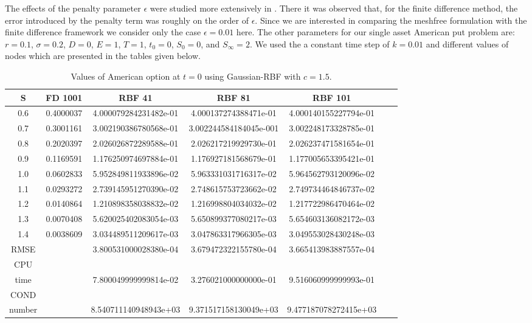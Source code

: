 \documentclass[12pt]{article}
\numberwithin{equation}{section} %
\begin{document}
The effects of the penalty parameter $\epsilon$ were studied more
extensively in \cite{ADS06}. There it was observed that, for the
finite difference method, the error introduced by the penalty term
was roughly on the order of $\epsilon$. Since we are interested in
comparing the meshfree formulation with the finite difference
framework we consider only the case $\epsilon=0.01$ here. The other
parameters for our single asset American put problem are: $r=0.1$,
$\sigma=0.2$, $D=0$, $E=1$, $T=1$, $t_0=0$, $S_0=0$, and
$S_\infty=2$. We used the  a constant time step of $k = 0.01$ and
different values of nodes which are presented in the tables given
below.
\newpage
\begin{table}[h]
\centering
\begin{tabular}{|c|c|c|c|c|c|c|}
  \hline
  S & FD 1001  & RBF 41 & RBF 81 & RBF 101 \\
  \hline
  0.6 & 0.4000037 &     4.000079284231482e-01 & 4.000137274388471e-01 & 4.000140155227794e-01 \\
  0.7 & 0.3001161  &3.002190386780568e-01  &3.002244584184045e-001 & 3.002248173328785e-01\\
  0.8 & 0.2020397  & 2.026026872289588e-01 & 2.026217219929730e-01 &  2.026237471581654e-01\\
  0.9 & 0.1169591  & 1.176250974697884e-01 & 1.176927181568679e-01 &   1.177005653395421e-01\\
  1.0 & 0.0602833  & 5.952849811933896e-02 & 5.963331031716317e-02 &  5.964562793120096e-02 \\
  1.1 & 0.0293272  & 2.739145951270390e-02 &  2.748615753723662e-02 &   2.749734464846737e-02\\
  1.2 & 0.0140864  & 1.210898358038832e-02  &  1.216998804034032e-02 & 1.217722986470464e-02 \\
  1.3 & 0.0070408  &5.620025402083054e-03   &  5.650899377080217e-03 & 5.654603136082172e-03 \\
  1.4 & 0.0038609  &3.034489511209617e-03& 3.047863317966305e-03 &  3.049553028430248e-03\\
  \hline
  RMSE &   &3.800531000028380e-04  &  3.679472322155780e-04 &  3.665413983887557e-04 \\
  \hline
  CPU &   &  &  &  \\
  time  &   & 7.800049999999814e-02 & 3.276021000000000e-01 & 9.516060999999993e-01 \\
  \hline
   COND &   &  &  &  \\
  number  &   & 8.540711140948943e+03 &  9.371517158130049e+03& 9.477187078272415e+03 \\
  \hline
\end{tabular}
  \caption{Values of American option at $t=0$ using Gaussian-RBF with $c=1.5$.}\label{Tab_1DFinal}
\end{table}
\end{document}

